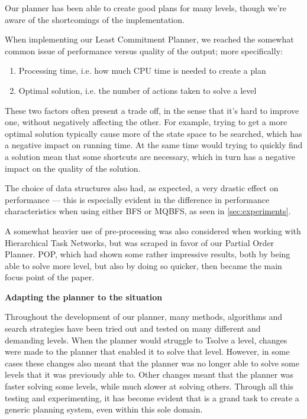\documentclass[Main]{subfiles}
\begin{document}
Our planner has been able to create good plans for many levels, though we're aware of the shortcomings of the implementation.




When implementing our Least Commitment Planner, we reached the somewhat common issue of performance versus quality of the output; more specifically:

\begin{enumerate}
	\item Processing time, i.e. how much CPU time is needed to create a plan
	\item Optimal solution, i.e. the number of actions taken to solve a level
\end{enumerate}

These two factors often present a trade off, in the sense that it's hard to improve one, without negatively affecting the other. 
For example, trying to get a more optimal solution typically cause more of the state space to be searched, which has a negative impact on running time.
At the same time would trying to quickly find a solution mean that some shortcuts are necessary, which in turn has a negative impact on the quality of the solution.

The choice of data structures also had, as expected, a very drastic effect on performance ---
this is especially evident in the difference in performance characteristics when using either BFS or MQBFS, as seen in \autoref{sec:experiments}.

A somewhat heavier use of pre-processing was also considered when working with Hierarchical Task Networks, but was scraped in favor of our Partial Order Planner. 
POP, which had shown some rather impressive results, both by being able to solve more level, but also by doing so quicker, then became the main focus point of the paper.


\textbf{Adapting the planner to the situation}

Throughout the development of our planner, many methods, algorithms and search strategies have been tried out and tested on many different and demanding levels. When the planner would struggle to Tsolve a level, changes were made to the planner that enabled it to solve that level. However, in some cases these changes also meant that the planner was no longer able to solve some levels that it was previously able to. Other changes meant that the planner was faster solving some levels, while much slower at solving others. Through all this testing and experimenting, it has become evident that is a grand task to create a generic planning system, even within this sole domain. 
\end{document}
